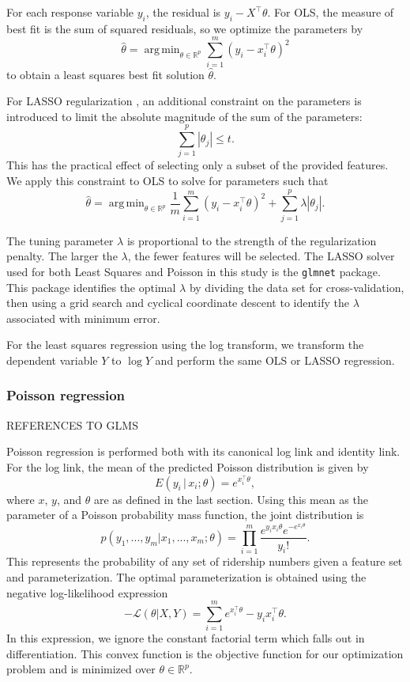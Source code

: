 \documentclass[11pt]{article}
\DeclareMathOperator*{\argmin}{arg\,min}
\begin{document}
For each response variable $y_i$, the residual is $y_i - X^\top\theta$. For OLS, the measure of best fit is the sum of squared residuals, so we optimize the parameters by
\[\hat{\theta} = \argmin_{\theta\in\mathbb{R}^p}\sum_{i=1}^m \left(y_i - x_i^\top\theta\right)^2\] to obtain a least squares best fit solution $\hat{\theta}$.

For LASSO regularization \cite{Tibshirani1996}, an additional constraint on the parameters is introduced to limit the absolute magnitude of the sum of the parameters: 
\[\sum_{j=1}^p |\theta_j|\leq t.\] This has the practical effect of selecting only a subset of the provided features. We apply this constraint to OLS to solve for parameters such that
\[\hat{\theta} = \argmin_{\theta\in\mathbb{R}^p} \frac{1}{m}\sum_{i=1}^m \left(y_i - x_i^\top\theta\right)^2 + \sum_{j=1}^p\lambda\left|\theta_j\right|.\]

The tuning parameter $\lambda$ is proportional to the strength of the regularization penalty. The larger the $\lambda$, the fewer features will be selected. The LASSO solver used for both Least Squares and Poisson in this study is the \texttt{glmnet} package. This package identifies the optimal $\lambda$ by dividing the data set for cross-validation, then using a grid search and cyclical coordinate descent to identify the $\lambda$ associated with minimum error.

For the least squares regression using the log transform, we transform the dependent variable $Y$ to $\log{Y}$ and perform the same OLS or LASSO regression.

\subsubsection{Poisson regression} \label{sec:poiss}

REFERENCES TO GLMS

Poisson regression is performed both with its canonical log link and identity link. For the log link, the mean of the predicted Poisson distribution is given by 
\[E(y_i\,|\,x_i;\theta) = e^{x_i^\top\theta},\]
where $x$, $y$, and $\theta$ are as defined in the last section. 
Using this mean as the parameter of a Poisson probability mass function, the joint distribution is
\[p(y_1, ..., y_m|x_1, ..., x_m; \theta) = \prod_{i=1}^m \frac{e^{y_ix_i\theta}e^{-e^{x_i\theta}}}{y_i!}.\]
This represents the probability of any set of ridership numbers given a feature set and parameterization. The optimal parameterization is obtained using the negative log-likelihood expression
\[-\mathcal{L}(\theta|X, Y) = \sum_{i=1}^m e^{x_i^\top\theta}-y_ix_i^\top\theta. \]
In this expression, we ignore the constant factorial term which falls out in differentiation. This convex function is the objective function for our optimization problem and is minimized over $\theta\in\mathbb{R}^p$.
\end{document}
